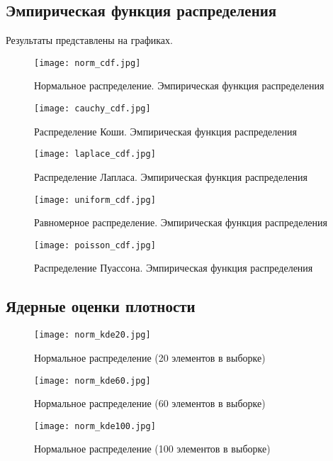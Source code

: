 \documentclass[main.tex]{subfiles}
\begin{document}
\subsection{Эмпирическая функция распределения}
Результаты представлены на графиках.
\begin{figure}[H]
	\centering \texttt{[image: norm\_cdf.jpg]}
	\caption{Нормальное распределение. Эмпирическая функция распределения}
	\label{img:norm_cdf}
\end{figure}
\begin{figure}[H]
	\centering \texttt{[image: cauchy\_cdf.jpg]}
	\caption{Распределение Коши. Эмпирическая функция распределения}
	\label{img:cauchy_cdf}
\end{figure}
\begin{figure}[H]
	\centering \texttt{[image: laplace\_cdf.jpg]}
	\caption{Распределение Лапласа. Эмпирическая функция распределения}
	\label{img:laplace_cdf}
\end{figure}
\begin{figure}[H]
	\centering \texttt{[image: uniform\_cdf.jpg]}
	\caption{Равномерное распределение. Эмпирическая функция распределения}
	\label{img:uniform_cdf}
\end{figure}
\begin{figure}[H]
	\centering \texttt{[image: poisson\_cdf.jpg]}
	\caption{Распределение Пуассона. Эмпирическая функция распределения}
	\label{img:poisson_cdf}
\end{figure}

\subsection{Ядерные оценки плотности}

\begin{figure}[H]
	\centering \texttt{[image: norm\_kde20.jpg]}
	\caption{Нормальное распределение (20 элементов в выборке)}
	\label{img:norm_kde20}
\end{figure}
\begin{figure}[H]
	\centering \texttt{[image: norm\_kde60.jpg]}
	\caption{Нормальное распределение (60 элементов в выборке)}
	\label{img:norm_kde60}
\end{figure}
\begin{figure}[H]
	\centering \texttt{[image: norm\_kde100.jpg]}
	\caption{Нормальное распределение (100 элементов в выборке)}
	\label{img:norm_kde100}
\end{figure}
\end{document}
